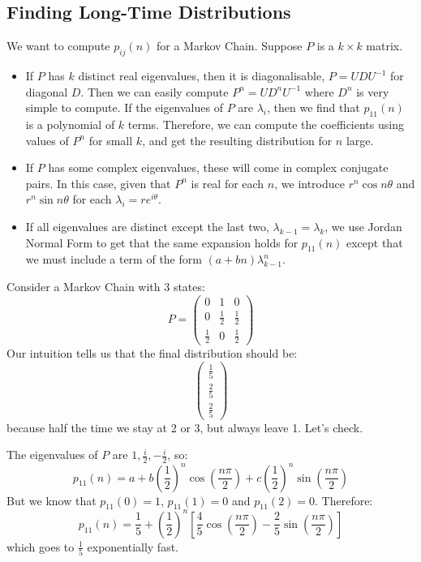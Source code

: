 \documentclass[../Main.tex]{subfiles}
\begin{document}
\subsection{Finding Long-Time Distributions}
We want to compute $p_{ij}(n)$ for a Markov Chain. Suppose $P$ is a $k \times k$ matrix.
\begin{itemize}
    \item If $P$ has $k$ distinct real eigenvalues, then it is diagonalisable, $P = UDU^{-1}$ for diagonal $D$. Then we can easily compute $P^n = UD^n U^{-1}$ where $D^n$ is very simple to compute. If the eigenvalues of $P$ are $\lambda_i$, then we find that $p_{11}(n)$ is a polynomial of $k$ terms. Therefore, we can compute the coefficients using values of $P^n$ for small $k$, and get the resulting distribution for $n$ large.
    \item If $P$ has some complex eigenvalues, these will come in complex conjugate pairs. In this case, given that $P^n$ is real for each $n$, we introduce $r^n\cos{n\theta}$ and $r^n\sin{n\theta}$ for each $\lambda_i = re^{i\theta}$.
    \item If all eigenvalues are distinct except the last two, $\lambda_{k - 1} = \lambda_k$, we use Jordan Normal Form to get that the same expansion holds for $p_{11}(n)$ except that we must include a term of the form $(a + bn) \lambda_{k-1}^n$.
\end{itemize}
\begin{example}
    Consider a Markov Chain with 3 states:
    \begin{equation*}
        P=
        \begin{pmatrix}
            0 & 1 & 0 \\
            0 & \frac12 & \frac12 \\
            \frac12 & 0 & \frac12
        \end{pmatrix}
    \end{equation*}
    Our intuition tells us that the final distribution should be:
    \begin{equation*}
        \begin{pmatrix}\frac15 \\ \frac25 \\ \frac25\end{pmatrix}
    \end{equation*}
    because half the time we stay at 2 or 3, but always leave 1. Let's check.

    The eigenvalues of $P$ are $1, \frac{i}{2}, -\frac{i}{2}$, so:
    \begin{equation*}
        p_{11}(n) = a + b\left(\frac12\right)^n \cos\left(\frac{n\pi}{2}\right) + c\left(\frac{1}{2}\right)^n \sin\left(\frac{n\pi}{2}\right)
    \end{equation*}
    But we know that $p_{11}(0) = 1$, $p_{11}(1) = 0$ and $p_{11}(2) = 0$. Therefore:
    \begin{equation*}
        p_{11}(n) = \frac15 + \left(\frac12\right)^n \left[\frac45 \cos\left(\frac{n\pi}{2}\right) - \frac25 \sin\left(\frac{n\pi}{2}\right)\right]
    \end{equation*}
    which goes to $\frac15$ exponentially fast.
\end{example}
\end{document}

